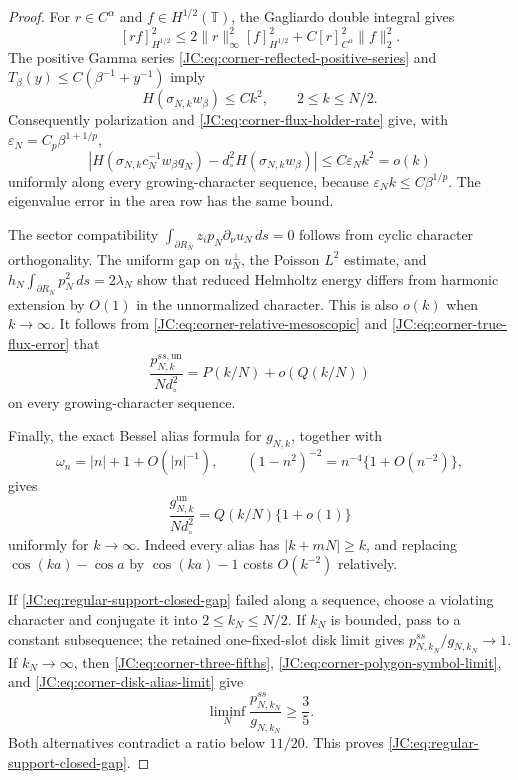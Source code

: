 \begin{proof}
For $r\in C^\alpha$ and $f\in H^{1/2}(\mathbb T)$, the Gagliardo
double integral gives
\[
 [rf]_{H^{1/2}}^2
 \le2\|r\|_\infty^2[f]_{H^{1/2}}^2
 +C[r]_{C^\alpha}^2\|f\|_2^2.
\]
The positive Gamma series
\eqref{JC:eq:corner-reflected-positive-series} and
$T_\beta(y)\le C(\beta^{-1}+y^{-1})$ imply
\begin{equation}\label{JC:eq:corner-trace-energy-upper}
 H(\sigma_{N,k}w_\beta)\le Ck^2,
 \qquad2\le k\le N/2.
\end{equation}
Consequently polarization and
\eqref{JC:eq:corner-flux-holder-rate} give, with
$\varepsilon_N=C_p\beta^{1+1/p}$,
\begin{equation}\label{JC:eq:corner-true-flux-error}
 \left|H(\sigma_{N,k}c_N^{-1}w_\beta q_N)
 -d_\circ^2H(\sigma_{N,k}w_\beta)\right|
 \le C\varepsilon_Nk^2=o(k)
\end{equation}
uniformly along every growing-character sequence, because
$\varepsilon_Nk\le C\beta^{1/p}$.  The eigenvalue error in the area
row has the same bound.

The sector compatibility
$\int_{\partial R_N}z_ip_N\partial_\nu u_N\,ds=0$
follows from cyclic character orthogonality.  The uniform gap on
$u_N^\perp$, the Poisson $L^2$ estimate, and
$h_N\int_{\partial R_N}p_N^2\,ds=2\lambda_N$ show that reduced
Helmholtz energy differs from harmonic extension by $O(1)$ in the
unnormalized character.  This is also $o(k)$ when $k\to\infty$.
It follows from
\eqref{JC:eq:corner-relative-mesoscopic} and
\eqref{JC:eq:corner-true-flux-error} that
\begin{equation}\label{JC:eq:corner-polygon-symbol-limit}
 \frac{p^{ss,\mathrm{un}}_{N,k}}{Nd_\circ^2}
 =P(k/N)+o(Q(k/N))
\end{equation}
on every growing-character sequence.

Finally, the exact Bessel alias formula for $g_{N,k}$, together with
\[
 \omega_n=|n|+1+O(|n|^{-1}),\qquad
 (1-n^2)^{-2}=n^{-4}\{1+O(n^{-2})\},
\]
gives
\begin{equation}\label{JC:eq:corner-disk-alias-limit}
 \frac{g^{\mathrm{un}}_{N,k}}{Nd_\circ^2}
 =Q(k/N)\{1+o(1)\}
\end{equation}
uniformly for $k\to\infty$.  Indeed every alias has
$|k+mN|\ge k$, and replacing
$\cos(ka)-\cos a$ by $\cos(ka)-1$ costs $O(k^{-2})$
relatively.

If \eqref{JC:eq:regular-support-closed-gap} failed along a sequence, choose
a violating character and conjugate it into $2\le k_N\le N/2$.
If $k_N$ is bounded, pass to a constant subsequence; the retained
one-fixed-slot disk limit gives
$p^{ss}_{N,k_N}/g_{N,k_N}\to1$.  If $k_N\to\infty$, then
\eqref{JC:eq:corner-three-fifths},
\eqref{JC:eq:corner-polygon-symbol-limit}, and
\eqref{JC:eq:corner-disk-alias-limit} give
\[
 \liminf_N\frac{p^{ss}_{N,k_N}}{g_{N,k_N}}\ge\frac35.
\]
Both alternatives contradict a ratio below $11/20$.  This proves
\eqref{JC:eq:regular-support-closed-gap}.
\end{proof}

